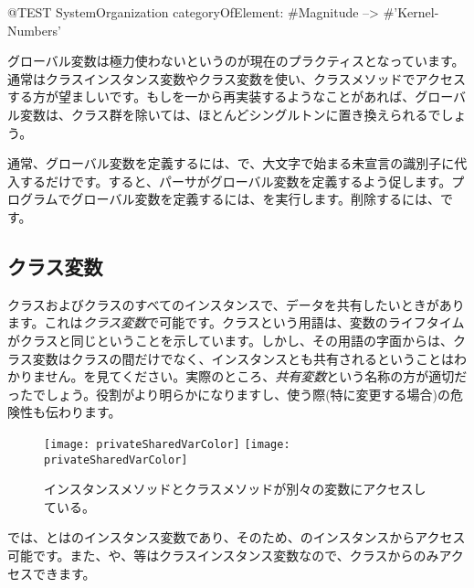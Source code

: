 \documentclass[a4paper,10pt,twoside]{book}
\begin{document}
\begin{code}{@TEST}
SystemOrganization categoryOfElement: #Magnitude --> #'Kernel-Numbers'
\end{code}

グローバル変数は極力使わないというのが現在のプラクティスとなっています。通常はクラスインスタンス変数やクラス変数を使い、クラスメソッドでアクセスする方が望ましいです。もし\pharo を一から再実装するようなことがあれば、グローバル変数は、クラス群を除いては、ほとんどシングルトンに置き換えられるでしょう。

通常、グローバル変数を定義するには、で、大文字で始まる未宣言の識別子に代入するだけです。すると、パーサがグローバル変数を定義するよう促します。プログラムでグローバル変数を定義するには、を実行します。削除するには、です。

\subsection{クラス変数}

クラスおよびクラスのすべてのインスタンスで、データを共有したいときがあります。これは\emph{クラス変数}で可能です。クラスという用語は、変数のライフタイムがクラスと同じということを示しています。しかし、その用語の字面からは、クラス変数はクラスの間だけでなく、インスタンスとも共有されるということはわかりません。を見てください。実際のところ、\emph{共有変数}という名称の方が適切だったでしょう。役割がより明らかになりますし、使う際(特に変更する場合)の危険性も伝わります。

\begin{figure}[htb]
\begin{center}
\ifluluelse
	{\texttt{[image: privateSharedVarColor]}}
	{\texttt{[image: privateSharedVarColor]}}
\caption{インスタンスメソッドとクラスメソッドが別々の変数にアクセスしている。}
\end{center}
\end{figure}

では、とはのインスタンス変数であり、そのため、のインスタンスからアクセス可能です。また、や、等はクラスインスタンス変数なので、クラスからのみアクセスできます。
\end{document}
